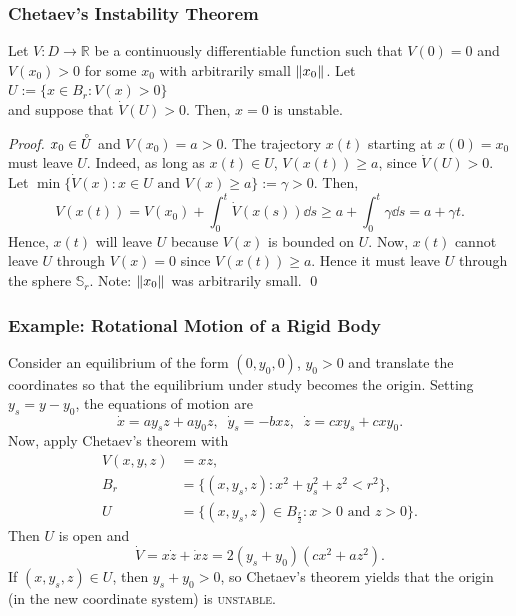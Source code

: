 \begin{frame}
    \frametitle{Chetaev's Instability Theorem}

    \begin{theorem}
        Let $V: D \rightarrow \mathbb{R}$ be a continuously differentiable
        function such that $V(0) = 0$ and $V(x_0) > 0$ for some $x_0$ with
        arbitrarily small $\|{x_0}\|_{{}_{}}$. Let\\[0.5ex] \hspace{35mm} $U := \{ x
        \in B_r: V(x) > 0\}$\\[0.5ex] and suppose that $\dot{V}(U) > 0$. Then,
        $x=0$ is unstable.
    \end{theorem}

    \begin{proof}
        $x_0 \in \accentset{\circ}{U}$ and $V(x_0) = a > 0$. The trajectory
        $x(t)$ starting at $x(0) = x_0$ must leave $U$. Indeed, as long as $x(t)
        \in U$, $V(x(t)) \geq a$, since $\dot{V}(U) > 0$. Let $\min 
        \{\dot{V}(x): x \in U \text{ and } V(x) \geq a \} := \gamma > 0$.  Then, 
        \[ V(x(t)) = V(x_0) + \int_0^t \dot{V}(x(s)) \dd s \geq a + \int_0^t
        \gamma \dd s = a + \gamma t. \] Hence, $x(t)$ will leave $U$ because
        $V(x)$ is bounded on $U$. Now, $x(t)$ cannot leave $U$ through $V(x) =
        0$ since $V(x(t)) \geq a$. Hence it must leave $U$ through the sphere
        $\mathbb{S}_r$. Note: $\|{x_0}\|_{{}_{}}$ was arbitrarily small. \hfill \qed
    \end{proof}
\end{frame}


\begin{frame}
    \frametitle{Example: Rotational Motion of a Rigid Body}

    Consider an equilibrium of the form $(0, y_0, 0)$, $y_0 > 0$ and translate
    the coordinates so that the equilibrium under study becomes the origin.
    Setting $y_s = y - y_0$, the equations of motion are
    \[ \dot{x} = ay_sz + ay_0z, \;\; \dot{y}_s = -bxz, \;\; \dot{z} = cxy_s +
    cxy_0. \] Now, apply Chetaev's theorem with 
    \begin{align*}
        V(x,y,z) &= xz, \\
        B_r &= \{ (x,y_s,z): x^2 + y_s^2 + z^2 < r^2 \}, \\
        U &= \{ (x,y_s,z) \in B_{\frac{r}{2}}: x > 0 \text{ and } z > 0 \}.
    \end{align*}
    Then $U$ is open and \[ \dot{V} = x\dot{z} + \dot{x}z = 2(y_s + y_0)(cx^2 +
    az^2). \] If $(x,y_s,z) \in U$, then $y_s + y_0 > 0$, so Chetaev's theorem 
    yields that the origin (in the new coordinate system) is \textsc{unstable}.
\end{frame}

\endgroup
